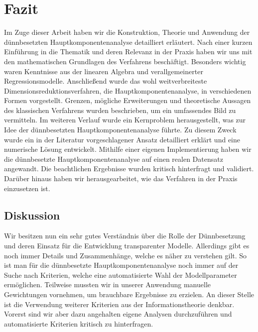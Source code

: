 \chapter{Fazit}

\label{conclusion}

Im Zuge dieser Arbeit haben wir die Konstruktion, Theorie und Anwendung der dünnbesetzten Hauptkomponentenanalyse detailliert erläutert.
Nach einer kurzen Einführung in die Thematik und deren Relevanz in der Praxis haben wir uns mit den mathematischen Grundlagen des Verfahrens beschäftigt. Besonders wichtig waren Kenntnisse aus der linearen Algebra und verallgemeinerter Regressionsmodelle. Anschließend wurde das wohl weitverbreiteste Dimensionsreduktionsverfahren, die Hauptkomponentenanalyse, in verschiedenen Formen vorgestellt. Grenzen, mögliche Erweiterungen und theoretische Aussagen des klassischen Verfahrens wurden beschrieben, um ein umfassendes Bild zu vermitteln. Im weiteren Verlauf wurde ein Kernproblem herausgestellt, was zur Idee der dünnbesetzten Hauptkomponentenanalyse führte. Zu diesem Zweck wurde ein in der Literatur vorgeschlagener Ansatz detailliert erklärt und eine numerische Lösung entwickelt. Mithilfe einer eigenen Implementierung haben wir die dünnbesetzte Hauptkomponentenanalyse auf einen realen Datensatz angewandt. Die beachtlichen Ergebnisse wurden kritisch hinterfragt und validiert. Darüber hinaus haben wir herausgearbeitet, wie das Verfahren in der Praxis einzusetzen ist.




\section{Diskussion}

Wir besitzen nun ein sehr gutes Verständnis über die Rolle der Dünnbesetzung und deren Einsatz für die Entwicklung transparenter Modelle. Allerdings gibt es noch immer Details und Zusammenhänge, welche es näher zu verstehen gilt. So ist man für die dünnbesetzte Hauptkomponentenanalyse noch immer auf der Suche nach Kriterien, welche eine automatisierte Wahl der Modellparameter ermöglichen. Teilweise mussten wir in unserer Anwendung manuelle Gewichtungen vornehmen, um brauchbare Ergebnisse zu erzielen. An dieser Stelle ist die Verwendung weiterer Kriterien aus der Informationstheorie denkbar. Vorerst sind wir aber dazu angehalten eigene Analysen durchzuführen und automatisierte Kriterien kritisch zu hinterfragen.

